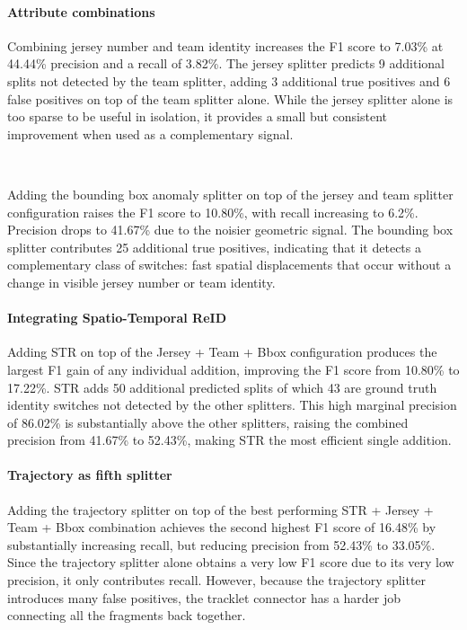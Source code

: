 \paragraph{Attribute combinations}
Combining jersey number and team identity increases the F1 score to 7.03\% at 44.44\% precision and a recall of 3.82\%. The jersey splitter predicts 9 additional splits not detected by the team splitter, adding 3 additional true positives and 6 false positives on top of the team splitter alone. While the jersey splitter alone is too sparse to be useful in isolation, it provides a small but consistent improvement when used as a complementary signal.

\

Adding the bounding box anomaly splitter on top of the jersey and team splitter configuration raises the F1 score to 10.80\%, with recall increasing to 6.2\%. Precision drops to 41.67\% due to the noisier geometric signal. The bounding box splitter contributes 25 additional true positives, indicating that it detects a complementary class of switches: fast spatial displacements that occur without a change in visible jersey number or team identity.


\paragraph{Integrating Spatio-Temporal ReID}
Adding STR on top of the Jersey + Team + Bbox configuration produces the largest F1 gain of any individual addition, improving the F1 score from 10.80\% to 17.22\%. STR adds 50 additional predicted splits of which 43 are ground truth identity switches not detected by the other splitters. This high marginal precision of 86.02\% is substantially above the other splitters, raising the combined precision from 41.67\% to 52.43\%, making STR the most efficient single addition.

\paragraph{Trajectory as fifth splitter}
Adding the trajectory splitter on top of the best performing STR + Jersey + Team + Bbox combination achieves the second highest F1 score of 16.48\% by substantially increasing recall, but reducing precision from 52.43\% to 33.05\%. Since the trajectory splitter alone obtains a very low F1 score due to its very low precision, it only contributes recall. However, because the trajectory splitter introduces many false positives, the tracklet connector has a harder job connecting all the fragments back together.

